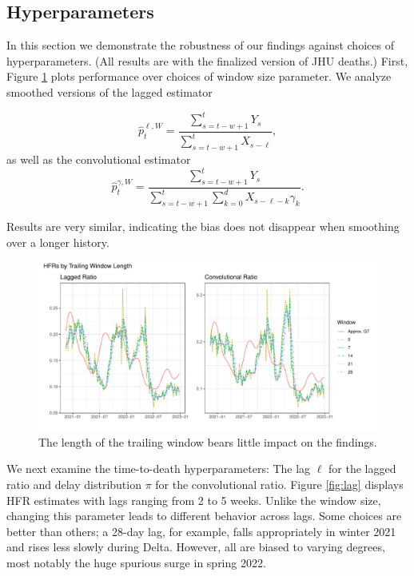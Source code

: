 \documentclass{article}
\begin{document}
\subsection{Hyperparameters}
In this section we demonstrate the robustness of our findings against choices of hyperparameters. (All results are with the finalized version of JHU deaths.) First, Figure \ref{fig:window} plots performance over choices of window size parameter. We analyze smoothed versions of the lagged estimator

\begin{equation}\label{eq:laggedSmooth}
    \hat{p}_t^{\ell, W} = \frac{\sum_{s=t-w+1}^{t} Y_s}{\sum_{s=t-w+1}^{t} X_{s-\ell}},
\end{equation}
\noindent as well as the convolutional estimator
\begin{equation}\label{eq:convSmooth}
    \hat{p}_t^{\gamma, W} = \frac{\sum_{s=t-w+1}^{t} Y_s}{\sum_{s=t-w+1}^{t} \sum_{k=0}^d X_{s-\ell-k}\gamma_k}.
\end{equation}

\noindent Results are very similar, indicating the bias does not disappear when smoothing over a longer history. 

\begin{figure}
    \centering
    \includegraphics[width=0.75\linewidth]{Figs/Real/window_size.pdf}
    \caption{The length of the trailing window bears little impact on the findings.}
    \label{fig:window}
\end{figure}

We next examine the time-to-death hyperparameters: The lag $\ell$ for the lagged ratio and delay distribution $\pi$ for the convolutional ratio. Figure \ref{fig:lag} displays HFR estimates with lags ranging from 2 to 5 weeks. Unlike the window size, changing this parameter leads to different behavior across lags. Some choices are better than others; a 28-day lag, for example, falls appropriately in winter 2021 and rises less slowly during Delta. However, all are biased to varying degrees, most notably the huge spurious surge in spring 2022.
\end{document}

